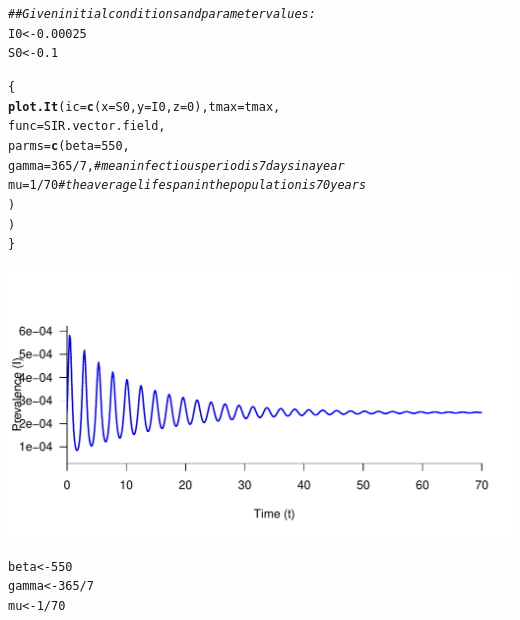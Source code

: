 \documentclass[12pt]{article}\usepackage[]{graphicx}\usepackage[]{color}
\makeatletter
\def\maxwidth{ %
  \ifdim\Gin@nat@width>\linewidth
    \linewidth
  \else
    \Gin@nat@width
  \fi
}
\newcommand{\hlnum}[1]{\textcolor[rgb]{0.686,0.059,0.569}{#1}}%
\newcommand{\hlcom}[1]{\textcolor[rgb]{0.678,0.584,0.686}{\textit{#1}}}%
\newcommand{\hlopt}[1]{\textcolor[rgb]{0,0,0}{#1}}%
\newcommand{\hlstd}[1]{\textcolor[rgb]{0.345,0.345,0.345}{#1}}%
\newcommand{\hlkwb}[1]{\textcolor[rgb]{0.69,0.353,0.396}{#1}}%
\newcommand{\hlkwc}[1]{\textcolor[rgb]{0.333,0.667,0.333}{#1}}%
\newcommand{\hlkwd}[1]{\textcolor[rgb]{0.737,0.353,0.396}{\textbf{#1}}}%
\newenvironment{kframe}{%
 \def\at@end@of@kframe{}%
 \ifinner\ifhmode%
  \def\at@end@of@kframe{\end{minipage}}%
  \begin{minipage}{\columnwidth}%
 \fi\fi%
 \def\FrameCommand##1{\hskip\@totalleftmargin \hskip-\fboxsep
 \colorbox{shadecolor}{##1}\hskip-\fboxsep
     \hskip-\linewidth \hskip-\@totalleftmargin \hskip\columnwidth}%
 \MakeFramed {\advance\hsize-\width
   \@totalleftmargin\z@ \linewidth\hsize
   \@setminipage}}%
 {\par\unskip\endMakeFramed%
 \at@end@of@kframe}
\newenvironment{knitrout}{}{} %
\makeatother
\begin{document}
\begin{enumerate}[(a)]
\begin{knitrout}
\begin{kframe}
\begin{alltt}
\hlcom{## Given initial conditions and parameter values:}
\hlstd{I0} \hlkwb{<-} \hlnum{0.00025}
\hlstd{S0} \hlkwb{<-} \hlnum{0.1}

\hlstd{\{}
\hlkwd{plot.It}\hlstd{(}\hlkwc{ic}\hlstd{=}\hlkwd{c}\hlstd{(}\hlkwc{x}\hlstd{=S0,}\hlkwc{y}\hlstd{=I0,}\hlkwc{z}\hlstd{=}\hlnum{0}\hlstd{),} \hlkwc{tmax}\hlstd{=tmax,}
\hlkwc{func}\hlstd{=SIR.vector.field,}
\hlkwc{parms}\hlstd{=}\hlkwd{c}\hlstd{(}\hlkwc{beta}\hlstd{=}\hlnum{550}\hlstd{,}
        \hlkwc{gamma}\hlstd{=}\hlnum{365}\hlopt{/}\hlnum{7}\hlstd{,} \hlcom{#mean infectious period is 7 days in a year}
        \hlkwc{mu}\hlstd{=}\hlnum{1}\hlopt{/}\hlnum{70} \hlcom{#the average lifespan in the population is 70 years}
        \hlstd{)}
\hlstd{)}
\hlstd{\}}
\end{alltt}
\end{kframe}
\includegraphics[width=\maxwidth]{figure/SIRmodel-1} 

\end{knitrout}

\begin{knitrout}
\color{fgcolor}\begin{kframe}
\begin{alltt}
\hlstd{beta} \hlkwb{<-} \hlnum{550}
\hlstd{gamma} \hlkwb{<-} \hlnum{365}\hlopt{/}\hlnum{7}
\hlstd{mu} \hlkwb{<-} \hlnum{1}\hlopt{/}\hlnum{70}


\end{alltt}
\end{kframe}
\end{knitrout}
\end{enumerate}
\end{document}

